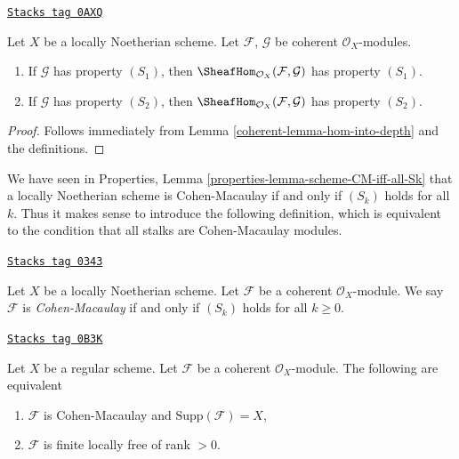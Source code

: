 \begin{lemma}
\label{coherent-lemma-hom-into-S2}
\href{https://stacks.math.columbia.edu/tag/0AXQ}{\texttt{Stacks tag 0AXQ}}

Let $X$ be a locally Noetherian scheme. Let $\mathcal{F}$, $\mathcal{G}$
be coherent $\mathcal{O}_X$-modules.
\begin{enumerate}
\item If $\mathcal{G}$ has property $(S_1)$, then
$\SheafHom_{\mathcal{O}_X}(\mathcal{F}, \mathcal{G})$ has property $(S_1)$.
\item If $\mathcal{G}$ has property $(S_2)$, then
$\SheafHom_{\mathcal{O}_X}(\mathcal{F}, \mathcal{G})$ has property $(S_2)$.
\end{enumerate}
\end{lemma}

\begin{proof}

Follows immediately from Lemma \ref{coherent-lemma-hom-into-depth}
and the definitions.
\end{proof}

We have seen in Properties, Lemma \ref{properties-lemma-scheme-CM-iff-all-Sk}
that a locally Noetherian
scheme is Cohen-Macaulay if and only if $(S_k)$ holds for all $k$.
Thus it makes sense to introduce the following definition, which
is equivalent to the condition that all stalks are Cohen-Macaulay modules.

\begin{definition}
\label{coherent-definition-Cohen-Macaulay}
\href{https://stacks.math.columbia.edu/tag/0343}{\texttt{Stacks tag 0343}}

Let $X$ be a locally Noetherian scheme.
Let $\mathcal{F}$ be a coherent $\mathcal{O}_X$-module.
We say $\mathcal{F}$ is {\it Cohen-Macaulay} if and only
if $(S_k)$ holds for all $k \geq 0$.
\end{definition}

\begin{lemma}
\label{coherent-lemma-Cohen-Macaulay-over-regular}
\href{https://stacks.math.columbia.edu/tag/0B3K}{\texttt{Stacks tag 0B3K}}

Let $X$ be a regular scheme. Let $\mathcal{F}$ be a coherent
$\mathcal{O}_X$-module. The following are equivalent
\begin{enumerate}
\item $\mathcal{F}$ is Cohen-Macaulay and $\text{Supp}(\mathcal{F}) = X$,
\item $\mathcal{F}$ is finite locally free of rank $> 0$.
\end{enumerate}
\end{lemma}

